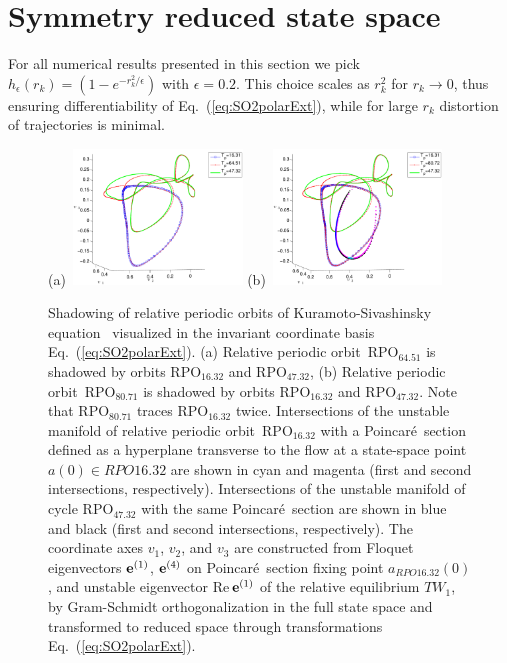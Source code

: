 \documentclass[aip,cha,showpacs,reprint]{revtex4-1} %
\newcommand{\refref} [1] {Ref.~\onlinecite{#1}}
\newcommand{\refeq}  [1] {Eq.~(\ref{#1})}                   %
\newcommand{\KSe}{Kuramoto-Siva\-shin\-sky equation}
\newcommand{\Poincare}{Poincar\'e}
\newcommand{\jEigvec}[1][]{\ensuremath{{\bf e}^{(#1)}}} %
\newcommand{\rpo}{rela\-ti\-ve periodic orbit}
\newcommand{\Rpo}{Rela\-ti\-ve periodic orbit}
\newcommand{\REQV}[2]{\ensuremath{TW_{#1#2}}} %
\newcommand{\RPO}[1]{\ensuremath{\mathrm{RPO}_{#1}}}
\newcommand{\ssp}{a}            %
\begin{document}
\section{Symmetry reduced state space}


For all numerical results presented in this section we pick
$h_\epsilon(r_k)=(1-e^{-r_k^2/\epsilon})$ with $\epsilon=0.2$. This choice
scales as $r_k^2$ for $r_k\rightarrow 0$, thus ensuring differentiability
of \refeq{eq:SO2polarExt}, while for large $r_k$ distortion of
trajectories is minimal.

\begin{figure}
 (a)~\includegraphics[width=0.40\textwidth]{ks22rpoT6451shad}
 (b)~\includegraphics[width=0.40\textwidth]{ks22rpoT8072shad_manif}
\caption{
 Shadowing of \rpo s of \KSe\
visualized in the invariant coordinate basis \refeq{eq:SO2polarExt}.
(a) \Rpo\ $\RPO{64.51}$ is shadowed by orbits $\RPO{16.32}$ and
$\RPO{47.32}$, (b) \Rpo\ $\RPO{80.71}$ is shadowed by orbits
$\RPO{16.32}$ and $\RPO{47.32}$. Note that $\RPO{80.71}$ traces
$\RPO{16.32}$ twice. Intersections of the unstable manifold of \rpo\
$\RPO{16.32}$ with a \Poincare\ section defined as a hyperplane
transverse to the flow at a state-space point $\ssp(0) \in RPO{16.32}$ are
shown in cyan and magenta (first and second intersections, respectively).
Intersections of the unstable manifold of cycle $\RPO{47.32}$ with the
same \Poincare\ section are shown in blue and black (first and second
intersections, respectively). The coordinate axes $v_1$, $v_2$, and $v_3$
are constructed from Floquet eigenvectors $\jEigvec[1]$, $\jEigvec[4]$ on
\Poincare\ section fixing point $\ssp_{RPO{16.32}}(0)$, and unstable
eigenvector {Re\,}$\jEigvec[1]$ of the relative equilibrium
\REQV{}{1}, by Gram-Schmidt orthogonalization in the full state space and
transformed to reduced space through transformations
\refeq{eq:SO2polarExt}.
}
\label{f:rpo_shad}
\end{figure}
\end{document}
